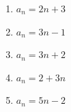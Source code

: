 \documentclass[preview,10pt]{standalone}
\begin{document}
\begin{enumerate}[label=\Alph*), itemsep=0.2em]
    \item $a_n = 2n + 3$
    \item $a_n = 3n - 1$
    \item $a_n = 3n + 2$
    \item $a_n = 2 + 3n$
    \item $a_n = 5n - 2$
\end{enumerate}
\end{document}
